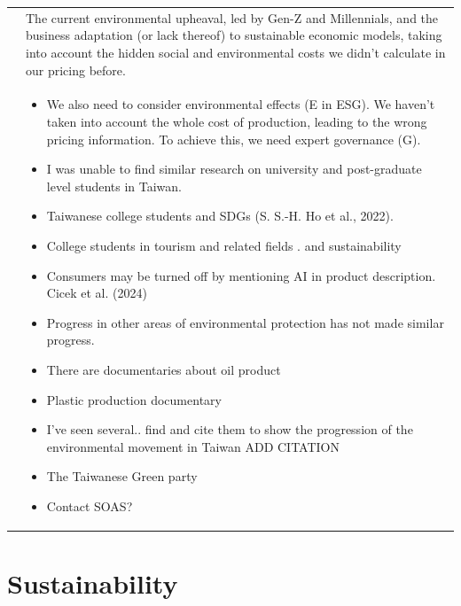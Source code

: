 \documentclass[
  letterpaper,
  DIV=11,
  numbers=noendperiod]{scrartcl}
\begin{document}
\begin{longtable}[]{@{}
  >{\raggedright\arraybackslash}p{}
  >{\raggedright\arraybackslash}p{}@{}}
\toprule\noalign{}
\endhead
\bottomrule\noalign{}
\endlastfoot
& The current environmental upheaval, led by Gen-Z and Millennials, and
the business adaptation (or lack thereof) to sustainable economic
models, taking into account the hidden social and environmental costs we
didn't calculate in our pricing before. \\
& \begin{minipage}[t]{\linewidth}\raggedright
\begin{itemize}
\item
  We also need to consider environmental effects (E in ESG). We haven't
  taken into account the whole cost of production, leading to the wrong
  pricing information. To achieve this, we need expert governance (G).
\item
  I was unable to find similar research on university and post-graduate
  level students in Taiwan.
\item
  Taiwanese college students and SDGs (S. S.-H. Ho et al., 2022).
\item
  College students in tourism and related fields . and sustainability
\item
  Consumers may be turned off by mentioning AI in product description.
  Cicek et al. (2024)
\item
  Progress in other areas of environmental protection has not made
  similar progress.
\item
  There are documentaries about oil product
\item
  Plastic production documentary
\item
  I've seen several.. find and cite them to show the progression of the
  environmental movement in Taiwan ADD CITATION
\item
  The Taiwanese Green party
\item
  Contact SOAS?
\end{itemize}
\end{minipage} \\
\end{longtable}

\newpage

\section{Sustainability}\label{sustainability}
\end{document}
